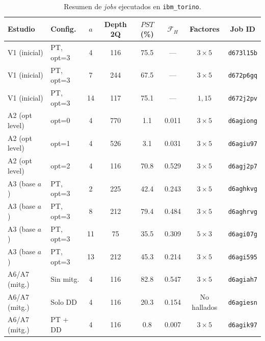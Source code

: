 \documentclass[12pt, spanish]{book}
\begin{document}
\begin{table}[H]
    \centering
    \caption{Resumen de \textit{jobs} ejecutados en \texttt{ibm\_torino}.\\}
    \label{tab:jobs_hardware}
    \footnotesize
    \begin{tabular}{llcccccc}
        \hline
        \textbf{Estudio} & \textbf{Config.} & $a$ & \textbf{Depth 2Q} & $PST$ (\%) & $\mathcal{F}_H$ & \textbf{Factores} & \textbf{Job ID}   \\
        \hline
        V1 (inicial)     & PT, opt=3        & 4   & 116               & 75.5       & ---             & $3 \times 5$      & \texttt{d673l15b} \\
        V1 (inicial)     & PT, opt=3        & 7   & 244               & 67.5       & ---             & $3 \times 5$      & \texttt{d672p6gq} \\
        V1 (inicial)     & PT, opt=3        & 14  & 117               & 75.1       & ---             & $1, 15$           & \texttt{d672j2pv} \\
        \hline
        A2 (opt level)   & opt=0            & 4   & 770               & 1.1        & 0.011           & $3 \times 5$      & \texttt{d6agiong} \\
        A2 (opt level)   & opt=1            & 4   & 526               & 3.1        & 0.031           & $3 \times 5$      & \texttt{d6agiu97} \\
        A2 (opt level)   & opt=2            & 4   & 116               & 70.8       & 0.529           & $3 \times 5$      & \texttt{d6agj2p7} \\
        \hline
        A3 (base $a$)    & PT, opt=3        & 2   & 225               & 42.4       & 0.243           & $3 \times 5$      & \texttt{d6aghkvg} \\
        A3 (base $a$)    & PT, opt=3        & 8   & 212               & 79.4       & 0.484           & $3 \times 5$      & \texttt{d6aghrvg} \\
        A3 (base $a$)    & PT, opt=3        & 11  & 75                & 35.5       & 0.309           & $5 \times 3$      & \texttt{d6agi07g} \\
        A3 (base $a$)    & PT, opt=3        & 13  & 212               & 45.3       & 0.214           & $3 \times 5$      & \texttt{d6agi595} \\
        \hline
        A6/A7 (mitg.)    & Sin mitg.        & 4   & 116               & 82.8       & 0.547           & $3 \times 5$      & \texttt{d6agiah7} \\
        A6/A7 (mitg.)    & Solo DD          & 4   & 116               & 20.3       & 0.154           & No hallados       & \texttt{d6agiesn} \\
        A6/A7 (mitg.)    & PT + DD          & 4   & 116               & 0.8        & 0.007           & $3 \times 5$      & \texttt{d6agik97} \\
        \hline
    \end{tabular}
\end{table}
\end{document}
